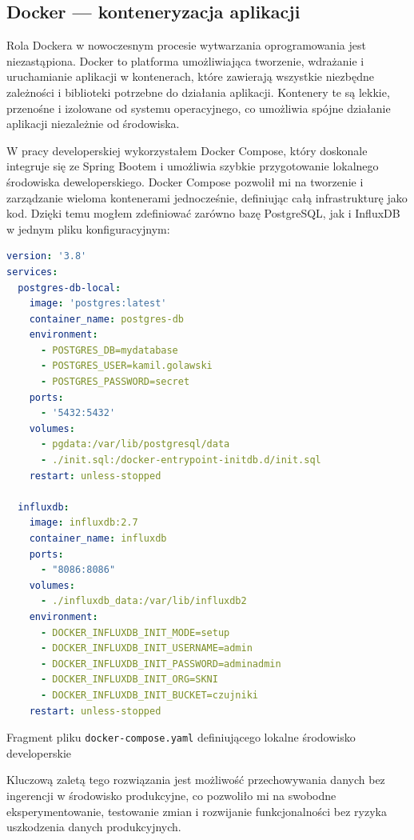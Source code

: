 \documentclass[a4paper,12pt,openany]{book}
\begin{document}
\subsection*{Docker --- konteneryzacja aplikacji}

Rola Dockera w nowoczesnym procesie wytwarzania oprogramowania jest niezastąpiona. Docker to platforma umożliwiająca tworzenie, wdrażanie i uruchamianie aplikacji w kontenerach, które zawierają wszystkie niezbędne zależności i biblioteki potrzebne do działania aplikacji. Kontenery te są lekkie, przenośne i izolowane od systemu operacyjnego, co umożliwia spójne działanie aplikacji niezależnie od środowiska.

W pracy developerskiej wykorzystałem Docker Compose, który doskonale integruje się ze Spring Bootem i umożliwia szybkie przygotowanie lokalnego środowiska deweloperskiego. Docker Compose pozwolił mi na tworzenie i zarządzanie wieloma kontenerami jednocześnie, definiując całą infrastrukturę jako kod. Dzięki temu mogłem zdefiniować zarówno bazę PostgreSQL, jak i InfluxDB w jednym pliku konfiguracyjnym:

\begin{lstfloat}[htbp]
\begin{lstlisting}[language=yaml]
version: '3.8'
services:
  postgres-db-local:
    image: 'postgres:latest'
    container_name: postgres-db
    environment:
      - POSTGRES_DB=mydatabase
      - POSTGRES_USER=kamil.golawski
      - POSTGRES_PASSWORD=secret
    ports:
      - '5432:5432'
    volumes:
      - pgdata:/var/lib/postgresql/data
      - ./init.sql:/docker-entrypoint-initdb.d/init.sql
    restart: unless-stopped

  influxdb:
    image: influxdb:2.7
    container_name: influxdb
    ports:
      - "8086:8086"
    volumes:
      - ./influxdb_data:/var/lib/influxdb2
    environment:
      - DOCKER_INFLUXDB_INIT_MODE=setup
      - DOCKER_INFLUXDB_INIT_USERNAME=admin
      - DOCKER_INFLUXDB_INIT_PASSWORD=adminadmin
      - DOCKER_INFLUXDB_INIT_ORG=SKNI
      - DOCKER_INFLUXDB_INIT_BUCKET=czujniki
    restart: unless-stopped
\end{lstlisting}
\caption{Fragment pliku \texttt{docker-compose.yaml} definiującego lokalne środowisko developerskie}
\label{lst:docker-compose}
\end{lstfloat}

Kluczową zaletą tego rozwiązania jest możliwość przechowywania danych bez ingerencji w środowisko produkcyjne, co pozwoliło mi na swobodne eksperymentowanie, testowanie zmian i rozwijanie funkcjonalności bez ryzyka uszkodzenia danych produkcyjnych.
\end{document}
